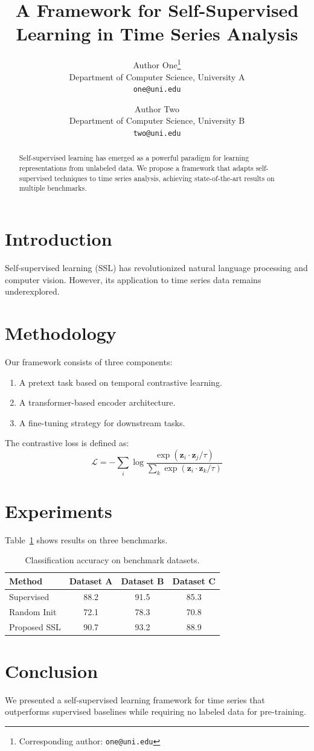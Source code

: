\documentclass{article}
\title{A Framework for Self-Supervised Learning in Time Series Analysis}
\author{
  Author One\thanks{Corresponding author: \texttt{one@uni.edu}} \\
  Department of Computer Science, University A \\
  \texttt{one@uni.edu} \\
  \and
  Author Two \\
  Department of Computer Science, University B \\
  \texttt{two@uni.edu}
}
\begin{document}
\maketitle

\begin{abstract}
Self-supervised learning has emerged as a powerful paradigm
for learning representations from unlabeled data. We propose
a framework that adapts self-supervised techniques to time
series analysis, achieving state-of-the-art results on
multiple benchmarks.
\end{abstract}

\section{Introduction}
Self-supervised learning (SSL) has revolutionized natural
language processing and computer vision. However, its
application to time series data remains underexplored.

\section{Methodology}
Our framework consists of three components:
\begin{enumerate}
\item A pretext task based on temporal contrastive learning.
\item A transformer-based encoder architecture.
\item A fine-tuning strategy for downstream tasks.
\end{enumerate}

The contrastive loss is defined as:
\begin{equation}
\mathcal{L} = -\sum_{i} \log \frac{\exp(\mathbf{z}_i \cdot \mathbf{z}_j / \tau)}
{\sum_k \exp(\mathbf{z}_i \cdot \mathbf{z}_k / \tau)}
\end{equation}

\section{Experiments}
Table~\ref{tab:results} shows results on three benchmarks.

\begin{table}[htbp]
\caption{Classification accuracy on benchmark datasets.}
\label{tab:results}
\centering
\begin{tabular}{lccc}
\toprule
Method & Dataset A & Dataset B & Dataset C \\
\midrule
Supervised & 88.2 & 91.5 & 85.3 \\
Random Init & 72.1 & 78.3 & 70.8 \\
Proposed SSL & 90.7 & 93.2 & 88.9 \\
\bottomrule
\end{tabular}
\end{table}

\section{Conclusion}
We presented a self-supervised learning framework for time
series that outperforms supervised baselines while requiring
no labeled data for pre-training.



\end{document}
